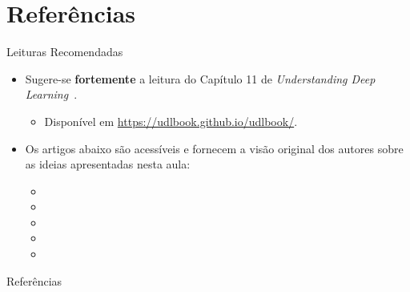 \documentclass[aspectratio=169,xcolor=dvipsnames]{beamer}
\begin{document}
\section{Referências}

\begin{frame}{Leituras Recomendadas}
    \leiturasize
\begin{itemize}
    \item Sugere-se \textbf{fortemente} a leitura do Capítulo 11 de \textit{Understanding Deep Learning}~\cite{prince2023understanding}.
    \begin{itemize}
        \item Disponível em \url{https://udlbook.github.io/udlbook/}.
    \end{itemize}
    \item Os artigos abaixo são acessíveis e fornecem a visão original dos autores sobre as ideias apresentadas nesta aula:
    \begin{itemize}
        \item {}
        \item {}
        \item {}
        \item {}
        \item {}
    \end{itemize}
\end{itemize}
\end{frame}

\begin{frame}{Referências}
\printbibliography
\end{frame}
\end{document}
